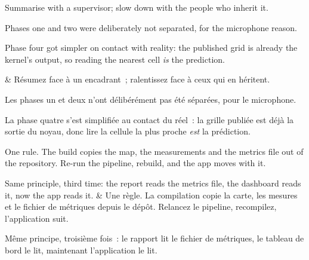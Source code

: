 \documentclass[10pt,a4paper]{article}
\begin{document}
\begin{say}
Summarise with a supervisor; slow down with the people who inherit it. 

Phases one and two were deliberately not separated, for the microphone reason.

Phase four got simpler on contact with reality: the published grid is already the
kernel's output, so reading the nearest cell \emph{is} the prediction.

&
Résumez face à un encadrant~; ralentissez face à ceux qui en héritent. 

Les phases un et deux n'ont délibérément pas été séparées, pour le microphone.

La phase quatre s'est simplifiée au contact du réel~: la grille publiée est déjà
la sortie du noyau, donc lire la cellule la plus proche \emph{est} la prédiction.

\end{say}

\begin{say}
One rule.  The build
copies the map, the measurements and the metrics file out of the repository. Re-run
the pipeline, rebuild, and the app moves with it.

Same principle, third time: the report reads the metrics file, the dashboard reads
it, now the app reads it. 
&
Une règle.  La compilation
copie la carte, les mesures et le fichier de métriques depuis le dépôt. Relancez
le pipeline, recompilez, l'application suit.

Même principe, troisième fois~: le rapport lit le fichier de métriques, le tableau
de bord le lit, maintenant l'application le lit. 
\end{say}
\end{document}
